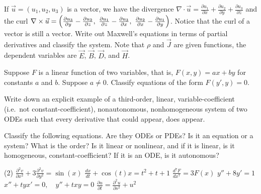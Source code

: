 \begin{exercise}
If $\vec{u} = (u_1,u_2,u_3)$ is a vector, we have the divergence
$\nabla \cdot \vec{u} =
\frac{\partial u_1}{\partial x} +
\frac{\partial u_2}{\partial y} +
\frac{\partial u_3}{\partial z}$ and
the curl
$\nabla \times \vec{u} =
\Bigl(
\frac{\partial u_3}{\partial y} - \frac{\partial u_2}{\partial z} , ~
\frac{\partial u_1}{\partial z} - \frac{\partial u_3}{\partial x} , ~
\frac{\partial u_2}{\partial x} - \frac{\partial u_1}{\partial y} \Bigr)$.
Notice that the curl of a vector is still a vector.  Write out Maxwell's
equations in terms of partial derivatives and classify the system.
Note that $\rho$ and $\vec{J}$ are given functions,
the dependent variables are $\vec{E}$, $\vec{B}$, $\vec{D}$, and $\vec{H}$.
\end{exercise}

\begin{exercise}
Suppose $F$ is a linear function of two variables, that is,
$F(x,y) = ax+by$ for constants $a$ and $b$.
Suppose $a \neq 0$.
Classify equations of the form $F(y',y) = 0$.
\end{exercise}

\begin{exercise}
Write down an explicit example of a third-order, linear,
variable-coefficient (i.e.\ not constant-coefficient),
nonautonomous, nonhomogeneous system of two ODEs such that every derivative
that could appear, does appear.
\end{exercise}

\setcounter{exercise}{100}

\begin{exercise}
Classify the following equations.  Are they ODEs or PDEs?  Is it an equation
or a system?  What is the order?  Is it linear or nonlinear, and if it is
linear, is it homogeneous, constant-coefficient?  If it is an ODE\@, is it
autonomous?
\begin{tasks}(2)
\task $\displaystyle \frac{\partial^2 v}{\partial x^2} + 3 \frac{\partial^2
v}{\partial y^2} = \sin(x)$
\task $\displaystyle \frac{d x}{dt} + \cos(t) x = t^2+t+1$
\task $\displaystyle \frac{d^7 F}{dx^7} = 3F(x)$
\task $\displaystyle y''+8y'=1$
\task $\displaystyle x''+tyx'=0, \quad y''+txy = 0$
\task $\displaystyle \frac{\partial u}{\partial t} = \frac{\partial^2 u}{\partial s^2} + u^2$
\end{tasks}
\end{exercise}

